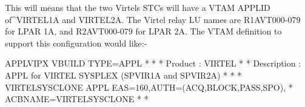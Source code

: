 \documentclass[letterpaper,10pt,english]{sphinxmanual}
\begin{document}
\begin{sphinxVerbatim}[commandchars=\\\{\}]
\end{sphinxVerbatim}

This will means that the two Virtels STCs will have a VTAM APPLID of\textasciicircum{}VIRTEL1A and VIRTEL2A. The Virtel relay LU names are R1AVT000-079 for LPAR 1A, and R2AVT000-079 for LPAR 2A.
The VTAM definition to support this configuration would like:-

\begin{sphinxVerbatim}[commandchars=\\\{\}]
APPLVIPX VBUILD TYPE=APPL
* \PYGZhy{}\PYGZhy{}\PYGZhy{}\PYGZhy{}\PYGZhy{}\PYGZhy{}\PYGZhy{}\PYGZhy{}\PYGZhy{}\PYGZhy{}\PYGZhy{}\PYGZhy{}\PYGZhy{}\PYGZhy{}\PYGZhy{}\PYGZhy{}\PYGZhy{}\PYGZhy{}\PYGZhy{}\PYGZhy{}\PYGZhy{}\PYGZhy{}\PYGZhy{}\PYGZhy{}\PYGZhy{}\PYGZhy{}\PYGZhy{}\PYGZhy{}\PYGZhy{}\PYGZhy{}\PYGZhy{}\PYGZhy{}\PYGZhy{}\PYGZhy{}\PYGZhy{}\PYGZhy{}\PYGZhy{}\PYGZhy{}\PYGZhy{}\PYGZhy{}\PYGZhy{}\PYGZhy{}\PYGZhy{}\PYGZhy{}\PYGZhy{}\PYGZhy{}\PYGZhy{}\PYGZhy{}\PYGZhy{}\PYGZhy{}\PYGZhy{}\PYGZhy{}\PYGZhy{}\PYGZhy{}\PYGZhy{}\PYGZhy{}\PYGZhy{}\PYGZhy{}\PYGZhy{}\PYGZhy{}\PYGZhy{}\PYGZhy{}\PYGZhy{}\PYGZhy{}\PYGZhy{}\PYGZhy{} *
* Product : VIRTEL                                                   *
* Description : APPL for VIRTEL SYSPLEX (SPVIR1A and SPVIR2A)        *
* \PYGZhy{}\PYGZhy{}\PYGZhy{}\PYGZhy{}\PYGZhy{}\PYGZhy{}\PYGZhy{}\PYGZhy{}\PYGZhy{}\PYGZhy{}\PYGZhy{}\PYGZhy{}\PYGZhy{}\PYGZhy{}\PYGZhy{}\PYGZhy{}\PYGZhy{}\PYGZhy{}\PYGZhy{}\PYGZhy{}\PYGZhy{}\PYGZhy{}\PYGZhy{}\PYGZhy{}\PYGZhy{}\PYGZhy{}\PYGZhy{}\PYGZhy{}\PYGZhy{}\PYGZhy{}\PYGZhy{}\PYGZhy{}\PYGZhy{}\PYGZhy{}\PYGZhy{}\PYGZhy{}\PYGZhy{}\PYGZhy{}\PYGZhy{}\PYGZhy{}\PYGZhy{}\PYGZhy{}\PYGZhy{}\PYGZhy{}\PYGZhy{}\PYGZhy{}\PYGZhy{}\PYGZhy{}\PYGZhy{}\PYGZhy{}\PYGZhy{}\PYGZhy{}\PYGZhy{}\PYGZhy{}\PYGZhy{}\PYGZhy{}\PYGZhy{}\PYGZhy{}\PYGZhy{}\PYGZhy{}\PYGZhy{}\PYGZhy{}\PYGZhy{}\PYGZhy{}\PYGZhy{}\PYGZhy{} *
VIRTEL\PYGZam{}SYSCLONE APPL EAS=160,AUTH=(ACQ,BLOCK,PASS,SPO),               *
      ACBNAME=VIRTEL\PYGZam{}SYSCLONE
* \PYGZhy{}\PYGZhy{}\PYGZhy{}\PYGZhy{}\PYGZhy{}\PYGZhy{}\PYGZhy{}\PYGZhy{}\PYGZhy{}\PYGZhy{}\PYGZhy{}\PYGZhy{}\PYGZhy{}\PYGZhy{}\PYGZhy{}\PYGZhy{}\PYGZhy{}\PYGZhy{}\PYGZhy{}\PYGZhy{}\PYGZhy{}\PYGZhy{}\PYGZhy{}\PYGZhy{}\PYGZhy{}\PYGZhy{}\PYGZhy{}\PYGZhy{}\PYGZhy{}\PYGZhy{}\PYGZhy{}\PYGZhy{}\PYGZhy{}\PYGZhy{}\PYGZhy{}\PYGZhy{}\PYGZhy{}\PYGZhy{}\PYGZhy{}\PYGZhy{}\PYGZhy{}\PYGZhy{}\PYGZhy{}\PYGZhy{}\PYGZhy{}\PYGZhy{}\PYGZhy{}\PYGZhy{}\PYGZhy{}\PYGZhy{}\PYGZhy{}\PYGZhy{}\PYGZhy{}\PYGZhy{}\PYGZhy{}\PYGZhy{}\PYGZhy{}\PYGZhy{}\PYGZhy{}\PYGZhy{}\PYGZhy{}\PYGZhy{}\PYGZhy{}\PYGZhy{}\PYGZhy{}\PYGZhy{} *

\end{sphinxVerbatim}
\end{document}
